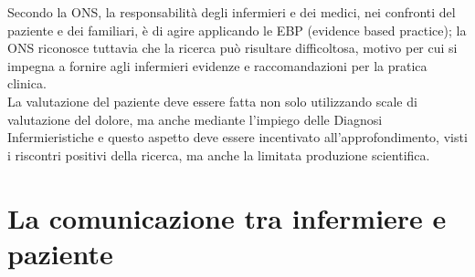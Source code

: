 Secondo la ONS, la responsabilità degli infermieri e dei medici, nei confronti del paziente e dei familiari, 
è di agire applicando le EBP (evidence based practice); la ONS riconosce tuttavia che la ricerca 
può risultare difficoltosa, motivo per cui si impegna a fornire agli infermieri 
evidenze e raccomandazioni per la pratica clinica\cite{PAINONS}.\\
La valutazione del paziente deve essere fatta non solo utilizzando scale di valutazione del dolore, ma anche 
mediante l’impiego delle Diagnosi Infermieristiche e questo aspetto deve essere 
incentivato all’approfondimento, visti i riscontri positivi della ricerca, ma anche la limitata 
produzione scientifica.

\section{La comunicazione tra infermiere e paziente}

